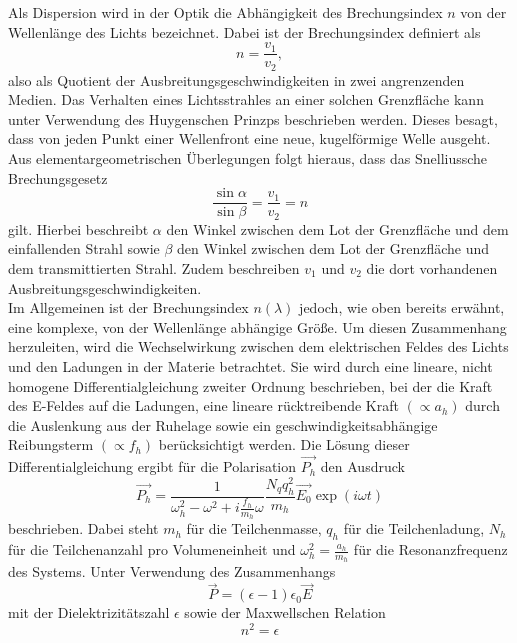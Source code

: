 Als Dispersion wird in der Optik die Abhängigkeit des Brechungsindex $n$ von der Wellenlänge des Lichts bezeichnet.
Dabei ist der Brechungsindex definiert als
\begin{equation}
  n = \frac{v_1}{v_2},
\end{equation}
also als Quotient der Ausbreitungsgeschwindigkeiten in zwei angrenzenden Medien.
Das Verhalten eines Lichtsstrahles an einer solchen Grenzfläche kann unter Verwendung des Huygenschen Prinzps beschrieben werden.
Dieses besagt, dass von jeden Punkt einer Wellenfront eine neue, kugelförmige Welle ausgeht.
Aus elementargeometrischen Überlegungen folgt hieraus, dass das Snelliussche Brechungsgesetz
\begin{equation}
  \frac{\sin{\alpha}}{\sin{\beta}} = \frac{v_1}{v_2} = n
\end{equation}
gilt.
Hierbei beschreibt $\alpha$ den Winkel zwischen dem Lot der Grenzfläche und dem einfallenden Strahl sowie $\beta$ den Winkel zwischen dem Lot der Grenzfläche und dem transmittierten Strahl.
Zudem beschreiben $v_1$ und $v_2$ die dort vorhandenen Ausbreitungsgeschwindigkeiten.\\
Im Allgemeinen ist der Brechungsindex $n(\lambda)$ jedoch, wie oben bereits erwähnt, eine komplexe, von der Wellenlänge abhängige Größe.
Um diesen Zusammenhang herzuleiten, wird die Wechselwirkung zwischen dem elektrischen Feldes des Lichts und den Ladungen in der Materie betrachtet.
Sie wird durch eine lineare, nicht homogene Differentialgleichung zweiter Ordnung beschrieben, bei der die Kraft des E-Feldes auf die Ladungen, eine lineare rücktreibende Kraft $( \propto a_h )$ durch die Auslenkung aus der Ruhelage sowie ein geschwindigkeitsabhängige Reibungsterm $(\propto f_h)$ berücksichtigt werden.
Die Lösung dieser Differentialgleichung ergibt für die Polarisation $\vec{P_h}$ den Ausdruck
\begin{equation}
  \vec{P_h} = \frac{1}{\omega_h^2 - \omega^2 + i \frac{f_h}{m_h}\omega} \frac{N_q q_h^2}{m_h} \vec{E_0} \exp{( i \omega t )}
\end{equation}
beschrieben.
Dabei steht $m_h$ für die Teilchenmasse, $q_h$ für die Teilchenladung, $N_h$ für die Teilchenanzahl pro Volumeneinheit und $\omega_h^2 = \frac{a_h}{m_h}$ für die Resonanzfrequenz des Systems.
Unter Verwendung des Zusammenhangs
\begin{equation}
  \vec{P} = (\epsilon - 1) \epsilon_0 \vec{E}
\end{equation}
mit der Dielektrizitätszahl $\epsilon$ sowie der Maxwellschen Relation
\begin{equation}
  n^2 = \epsilon
\end{equation}
